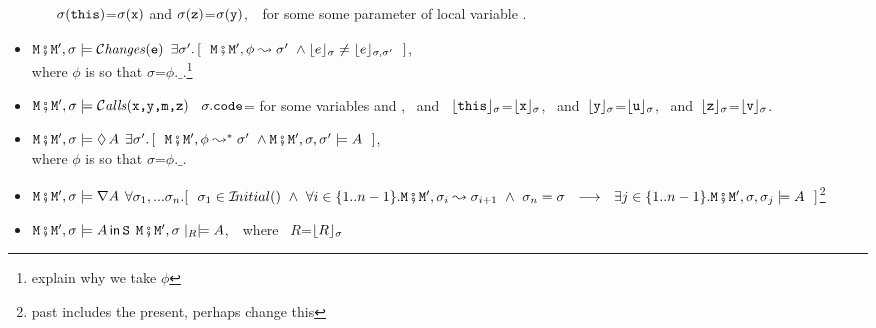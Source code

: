 \begin{definition}
\begin{itemize}
\begin{itemize}
$\sigma(\prg{this})$=$\sigma(\prg{x})$ and
  $\sigma(\prg{z})$=$\sigma(\prg{y})$,
  $\strut \hspace{0.1cm}$
for some some parameter of local variable .
 \end{itemize}
 \item
 $\M\mkpair \M', \sigma \models   \Changes{\prg{e}}$  \IFF 
 $\exists \sigma'.\, [\ \ \M\mkpair \M',\phi \leadsto \sigma' \ \wedge \interp{e}{\sigma} \neq \interp{e}{\sigma,\sigma'} \ \  ]$,\\
 where $\phi$ is so that $\sigma$=$\phi.\_$.\footnote{explain why we take $\phi$}
 \item
$\M\mkpair \M', \sigma \models  \Calls{\prg{x},\prg{y},\prg{m},\prg{z}}$ \IFF \
 $\sigma.\prg{code}$= for some variables  and ,  \ and \  
$\interp{\prg{this}}{\sigma}$=$\interp{\prg{x}}{\sigma}$, \ and\ $\interp{\prg{y}}{\sigma}$=$\interp{\prg{u}}{\sigma}$,
 \ and\ $\interp{\prg{z}}{\sigma}$=$\interp{\prg{v}}{\sigma}$.
 \item
  $\M\mkpair \M', \sigma \models  \Future \A $
  \IFF
  $\exists \sigma'.\, [\ \ \M\mkpair \M',\phi \leadsto^* \sigma' \ \wedge \M\mkpair \M',\sigma,\sigma' \models \A \ \  ]$,\\
 where $\phi$ is so that $\sigma$=$\phi.\_$.

 \item
 $\M\mkpair \M', \sigma \models  \Past \A $ \IFF 
 $\forall \sigma_1, ... \sigma_n. [\ \ \sigma_1\in \Initial{}\ \wedge \ 
 \forall i\in\{1..n-1\}. \M\mkpair \M', \sigma_{i} \leadsto  \sigma_{i+1} \ \wedge \ 
 \sigma_n=\sigma \ \ \longrightarrow \ \ \exists j\in\{1..n-1\}.
 \M\mkpair \M', \sigma, \sigma_j  \models \A\ \ 
 ]$\footnote{past includes the present, perhaps change this}
 
 \item
 $\M\mkpair \M', \sigma \models \Using \A \prg{S}$
 \IFF
 $\M\mkpair \M', \sigma\mid_R \models  \A  $,\ \ where \ $R$=$\interp{R}{\sigma}$



\end{itemize}
\end{definition}
